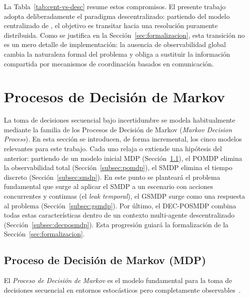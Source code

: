 La Tabla~\ref{tab:cent-vs-desc} resume estos compromisos. El presente trabajo adopta deliberadamente el paradigma descentralizado: partiendo del modelo centralizado de , el objetivo es transitar hacia una resolución puramente distribuida. Como se justifica en la Sección~\ref{sec:formalizacion}, esta transición no es un mero detalle de implementación: la ausencia de observabilidad global cambia la naturaleza formal del problema y obliga a sustituir la información compartida por mecanismos de coordinación basados en comunicación.


\section{Procesos de Decisión de Markov} \label{sec:modelos} %

La toma de decisiones secuencial bajo incertidumbre se modela habitualmente mediante la familia de los Procesos de Decisión de Markov (\textit{Markov Decision Process}). En esta sección se introducen, de forma incremental, los cinco modelos relevantes para este trabajo. Cada uno relaja o extiende una hipótesis del anterior: partiendo de un modelo inicial MDP (Sección~\ref{subsec:mdp}), el POMDP elimina la observabilidad total (Sección~\ref{subsec:pomdp}), el SMDP elimina el tiempo discreto (Sección~\ref{subsec:smdp}). En este punto se planteará el problema fundamental que surge al aplicar el SMDP a un escenario con acciones concurrentes y continuas (el \emph{leak temporal}), el GSMDP surge como una respuesta al problema (Sección~\ref{subsec:gsmdp}). Por último, el DEC-POSMDP combina todas estas características dentro de un contexto multi-agente descentralizado (Sección~\ref{subsec:decposmdp}). Esta progresión guiará la formalización de la Sección~\ref{sec:formalizacion}.


\subsection{Proceso de Decisión de Markov (MDP)} \label{subsec:mdp} %

El \emph{Proceso de Decisión de Markov} es el modelo fundamental para la toma de decisiones secuencial en entornos estocásticos pero completamente observables~\cite{bellman1957dynamic,puterman1994markov}.

